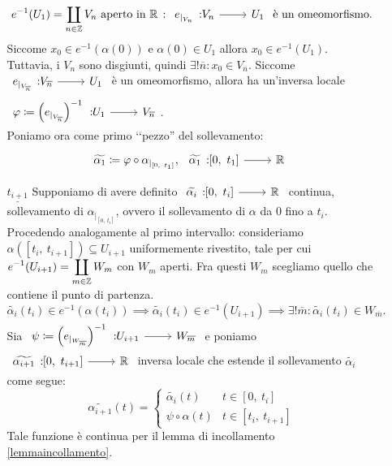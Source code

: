 \begin{demonstration}
\begin{itemize}
\begin{enumerate}
			\begin{equation*}
				 e^{-1}(U_1) = \coprod_{n\in\integerset}V_n\text{ aperto in } \realset\ \colon \funz {e_{\mid_{V_n}}} {V_n} {U_1} \text{ è un omeomorfismo.}
			\end{equation*}
			Siccome $x_0\in e^{-1}(\alpha(0))$ e $\alpha(0)\in U_1$ allora $x_0\in e^{-1}(U_1)$. Tuttavia, i $V_n$ sono disgiunti, quindi $\exists ! \overline{n} \colon x_0\in V_{\overline{n}}$. Siccome $\funz {e_{\mid_{V_{\overline{n}}}}} {V_{\overline{n}}} {U_1}$ è un omeomorfismo, allora ha un'inversa locale $\funz {\phi\coloneqq \left(e_{\mid_{V_{\overline{n}}}}\right)^{-1}} {U_1} {V_{\overline{n}}}$.\\
			Poniamo ora come primo ‘‘pezzo'' del sollevamento:
			\begin{equation*}
				\widetilde{\alpha_1}\coloneqq \phi\circ \alpha_{\mid_{[0,\ t_1]}},\ \funz {\widetilde{\alpha_1}} {[0,\ t_1]} \realset
			\end{equation*}
		\item[$\underline{t_{i+1}}$] Supponiamo di avere definito $\funz {\widetilde{\alpha_i}} {[0,\ t_i]} \realset$ continua, sollevamento di $\alpha_{\mid_{[0,\ t_i]}}$, ovvero il sollevamento di $\alpha$ da $0$ fino a $t_i$.\\
		Procedendo analogamente al primo intervallo: consideriamo $\alpha\left( [t_i,\ t_{i+1}] \right)\subseteq U_{i+1}$ uniformemente rivestito, tale per cui $\displaystyle e^{-1}(U_{i+1})=\coprod_{m\in\mathbb{Z}} W_m$ con $W_m$ aperti. Fra questi $W_m$ scegliamo quello che contiene il punto di partenza.
		\begin{equation*}
			\widetilde{\alpha_i}(t_i)\in e^{-1}\left( \alpha(t_i) \right) \implies \widetilde{\alpha_i}(t_i)\in e^{-1}\left( U_{i+1} \right) \implies \exists ! \overline{m} \colon \widetilde{\alpha_i}(t_i)\in W_{\overline{m}}.
		\end{equation*}
	Sia $\funz {\psi\coloneqq \left( e_{\mid_{W_{\overline{m}}}} \right)^{-1}} {U_{i+1}} {W_{\overline{m}}}$ e poniamo $\funz {\widetilde{\alpha_{i+1}}} {[0,\ t_{i+1}]} \realset$ inversa locale che estende il sollevamento $\widetilde{\alpha_i}$ come segue:
	\begin{equation*}
		\widetilde{\alpha_{i+1}}(t)= \begin{cases}
			\widetilde{\alpha_i}(t) & t\in [0,\ t_i]\\
			\psi\circ \alpha(t) & t\in[t_i,\ t_{i+1}]
		\end{cases}
	\end{equation*}
		Tale funzione è continua per il lemma di incollamento \ref{lemmaincollamento}.

\end{enumerate}
\end{itemize}
\end{demonstration}
